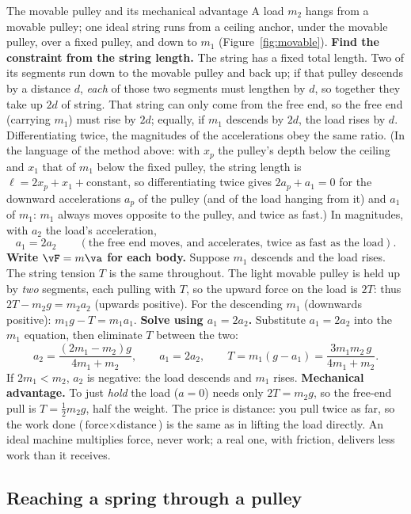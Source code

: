 \begin{derivbox}{The movable pulley and its mechanical advantage}
A load $m_2$ hangs from a movable pulley; one ideal string runs from a ceiling anchor, under the movable
pulley, over a fixed pulley, and down to $m_1$ (Figure~\ref{fig:movable}).
 \textbf{Find the constraint from the string length.} The string has a fixed total length. Two
of its segments run down to the movable pulley and back up; if that pulley descends by a distance $d$,
\emph{each} of those two segments must lengthen by $d$, so together they take up $2d$ of string. That
string can only come from the free end, so the free end (carrying $m_1$) must rise by $2d$; equally, if
$m_1$ descends by $2d$, the load rises by $d$. Differentiating twice, the magnitudes of the accelerations
obey the same ratio. (In the language of the method above: with $x_p$ the pulley's depth below the
ceiling and $x_1$ that of $m_1$ below the fixed pulley, the string length is $\ell=2x_p+x_1+\text{constant}$, so
differentiating twice gives $2a_p+a_1=0$ for the downward accelerations $a_p$ of the pulley (and of the
load hanging from it) and $a_1$ of $m_1$: $m_1$ always moves opposite to the pulley, and twice as fast.)
In magnitudes, with $a_2$ the load's acceleration,
\[
a_1=2a_2\qquad(\text{the free end moves, and accelerates, twice as fast as the load}).
\]
 \textbf{Write $\vF=m\va$ for each body.} Suppose $m_1$ descends and the load rises. The string
tension $T$ is the same throughout. The light movable pulley is held up by \emph{two} segments, each
pulling with $T$, so the upward force on the load is $2T$: thus $2T-m_2 g=m_2 a_2$ (upwards positive).
For the descending $m_1$ (downwards positive): $m_1 g-T=m_1 a_1$.
 \textbf{Solve using $a_1=2a_2$.} Substitute $a_1=2a_2$ into the $m_1$ equation, then eliminate
$T$ between the two:
\[
a_2=\frac{(2m_1-m_2)g}{4m_1+m_2},\qquad a_1=2a_2,\qquad T=m_1(g-a_1)=\frac{3m_1m_2\,g}{4m_1+m_2}.
\]
If $2m_1<m_2$, $a_2$ is negative: the load descends and $m_1$ rises.
 \textbf{Mechanical advantage.} To just \emph{hold} the load ($a=0$) needs only $2T=m_2 g$, so
the free-end pull is $T=\tfrac12 m_2 g$, half the weight. The price is distance: you pull twice as far,
so the work done ($\text{force}\times\text{distance}$) is the same as in lifting the load directly. An
ideal machine multiplies force, never work; a real one, with friction, delivers less work than it
receives.
\end{derivbox}

\subsection{Reaching a spring through a pulley}

